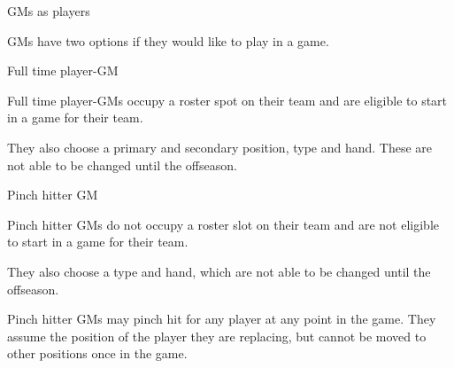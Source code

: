 \begin{deepEnumerate}
\begin{deepEnumerate}
\begin{deepEnumerate}
		\end{deepEnumerate}
		\item GMs as players
		\label{sec:GMs as Players}
		\begin{deepEnumerate}
			\item GMs have two options if they would like to play in a game.
			\begin{deepEnumerate}
				\item Full time player-GM
				\begin{deepEnumerate}
					\item Full time player-GMs occupy a roster spot on their team and are eligible to start in a game for their team.
					\item They also choose a primary and secondary position, type and hand.	These are not able to be changed until the offseason.
				\end{deepEnumerate}
				\item Pinch hitter GM
				\begin{deepEnumerate}
					\item Pinch hitter GMs do not occupy a roster slot on their team and are not eligible to start in a game for their team.
					\item They also choose a type and hand,	which are not able to be changed until the offseason.
					\item Pinch hitter GMs may pinch hit for any player at any point in the game. They assume the position of the player they are replacing,
					but cannot be moved to other positions once in the game.
				\end{deepEnumerate}
			\end{deepEnumerate}
		\end{deepEnumerate}
	\end{deepEnumerate}
\end{deepEnumerate}

